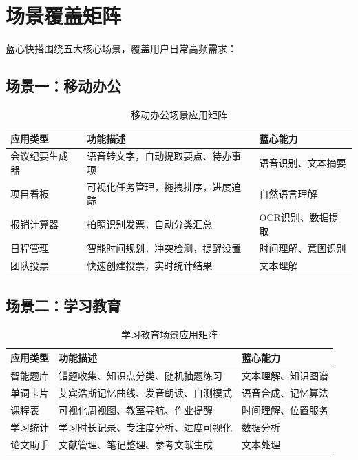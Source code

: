 \documentclass[a4paper,12pt]{ctexart}
\begin{document}
\section{场景覆盖矩阵}

蓝心快搭围绕五大核心场景，覆盖用户日常高频需求：

\subsection{场景一：移动办公}

\begin{table}[H]
    \centering
    \caption{移动办公场景应用矩阵}
    \begin{tabularx}{\textwidth}{|l|X|l|}
        \hline
        \textbf{应用类型} & \textbf{功能描述} & \textbf{蓝心能力} \\
        \hline
        会议纪要生成器 & 语音转文字，自动提取要点、待办事项 & 语音识别、文本摘要 \\
        \hline
        项目看板 & 可视化任务管理，拖拽排序，进度追踪 & 自然语言理解 \\
        \hline
        报销计算器 & 拍照识别发票，自动分类汇总 & OCR识别、数据提取 \\
        \hline
        日程管理 & 智能时间规划，冲突检测，提醒设置 & 时间理解、意图识别 \\
        \hline
        团队投票 & 快速创建投票，实时统计结果 & 文本理解 \\
        \hline
    \end{tabularx}
\end{table}

\subsection{场景二：学习教育}

\begin{table}[H]
    \centering
    \caption{学习教育场景应用矩阵}
    \begin{tabularx}{\textwidth}{|l|X|l|}
        \hline
        \textbf{应用类型} & \textbf{功能描述} & \textbf{蓝心能力} \\
        \hline
        智能题库 & 错题收集、知识点分类、随机抽题练习 & 文本理解、知识图谱 \\
        \hline
        单词卡片 & 艾宾浩斯记忆曲线、发音朗读、自测模式 & 语音合成、记忆算法 \\
        \hline
        课程表 & 可视化周视图、教室导航、作业提醒 & 时间理解、位置服务 \\
        \hline
        学习统计 & 学习时长记录、专注度分析、进度可视化 & 数据分析 \\
        \hline
        论文助手 & 文献管理、笔记整理、参考文献生成 & 文本处理 \\
        \hline
    \end{tabularx}
\end{table}
\end{document}
